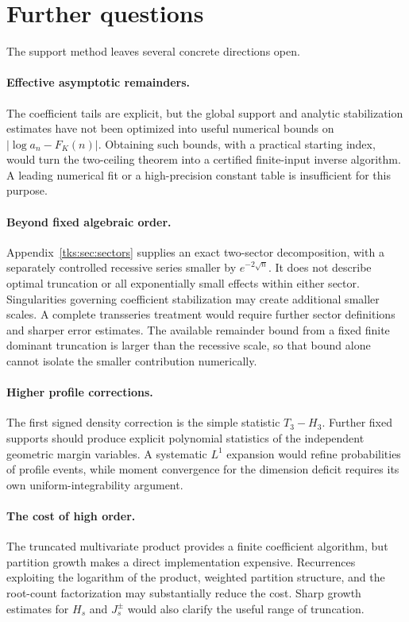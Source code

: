 \section{Further questions}\label{tks:sec:outlook}
The support method leaves several concrete directions open.

\paragraph{Effective asymptotic remainders.}
The coefficient tails are explicit, but the global support and analytic stabilization estimates have not been optimized into useful numerical bounds on $|\log a_n-F_K(n)|$. Obtaining such bounds, with a practical starting index, would turn the two-ceiling theorem into a certified finite-input inverse algorithm. A leading numerical fit or a high-precision constant table is insufficient for this purpose.

\paragraph{Beyond fixed algebraic order.}
Appendix~\ref{tks:sec:sectors} supplies an exact two-sector decomposition, with a separately controlled recessive series smaller by $e^{-2\sqrt n}$. It does not describe optimal truncation or all exponentially small effects within either sector. Singularities governing coefficient stabilization may create additional smaller scales. A complete transseries treatment would require further sector definitions and sharper error estimates. The available remainder bound from a fixed finite dominant truncation is larger than the recessive scale, so that bound alone cannot isolate the smaller contribution numerically.

\paragraph{Higher profile corrections.}
The first signed density correction is the simple statistic $T_3-H_3$. Further fixed supports should produce explicit polynomial statistics of the independent geometric margin variables. A systematic $L^1$ expansion would refine probabilities of profile events, while moment convergence for the dimension deficit requires its own uniform-integrability argument.

\paragraph{The cost of high order.}
The truncated multivariate product provides a finite coefficient algorithm, but partition growth makes a direct implementation expensive. Recurrences exploiting the logarithm of the product, weighted partition structure, and the root-count factorization may substantially reduce the cost. Sharp growth estimates for $H_s$ and $J_s^\pm$ would also clarify the useful range of truncation.

